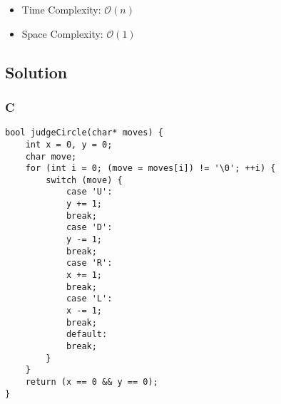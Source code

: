 \begin{itemize}
\item Time Complexity: $\mathcal{O}(n)$
\item Space Complexity: $\mathcal{O}(1)$
\end{itemize}

\subsection*{Solution}
\subsubsection*{C}
\begin{verbatim}
bool judgeCircle(char* moves) {
    int x = 0, y = 0;
    char move;
    for (int i = 0; (move = moves[i]) != '\0'; ++i) {
        switch (move) {
            case 'U':
            y += 1;
            break;
            case 'D':
            y -= 1;
            break;
            case 'R':
            x += 1;
            break;
            case 'L':
            x -= 1;
            break;
            default:
            break;
        }
    }
    return (x == 0 && y == 0);
}
\end{verbatim}

\newpage


